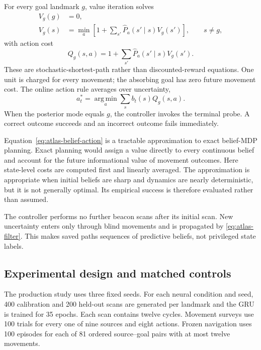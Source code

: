 \documentclass[11pt]{article}
\newcommand{\argmin}{\operatorname*{arg\,min}}
\begin{document}
For every goal landmark $g$, value iteration solves
\begin{align}
 V_g(g)&=0,\\
 V_g(s)&=\min_a\left[1+\sum_{s'}
 \widehat P_a(s'\mid s)V_g(s')\right],\qquad s\ne g,
 \label{eq:atlas-bellman}
\end{align}
with action cost
\begin{equation}
 Q_g(s,a)=1+\sum_{s'}\widehat P_a(s'\mid s)V_g(s').
 \label{eq:atlas-qcost}
\end{equation}
These are stochastic-shortest-path rather than discounted-reward equations.
One unit is charged for every movement; the absorbing goal has zero future
movement cost. The online action rule averages over uncertainty,
\begin{equation}
 a_t^*=\argmin_a\sum_s b_t(s)Q_g(s,a).
 \label{eq:atlas-belief-action}
\end{equation}
When the posterior mode equals $g$, the controller invokes the terminal probe.
A correct outcome succeeds and an incorrect outcome fails immediately.

Equation~\eqref{eq:atlas-belief-action} is a tractable approximation to exact
belief-MDP planning. Exact planning would assign a value directly to every
continuous belief and account for the future informational value of movement
outcomes. Here state-level costs are computed first and linearly averaged. The
approximation is appropriate when initial beliefs are sharp and dynamics are
nearly deterministic, but it is not generally optimal. Its empirical success
is therefore evaluated rather than assumed.

The controller performs no further beacon scans after its initial scan. New
uncertainty enters only through blind movements and is propagated by
\cref{eq:atlas-filter}. This makes saved paths sequences of predictive beliefs,
not privileged state labels.

\subsection{Experimental design and matched controls}

The production study uses three fixed seeds. For each neural condition and
seed, 400 calibration and 200 held-out scans are generated per landmark and
the GRU is trained for 35 epochs. Each scan contains twelve cycles. Movement
surveys use 100 trials for every one of nine sources and eight actions.
Frozen navigation uses 100 episodes for each of 81 ordered source--goal pairs
with at most twelve movements.
\end{document}
